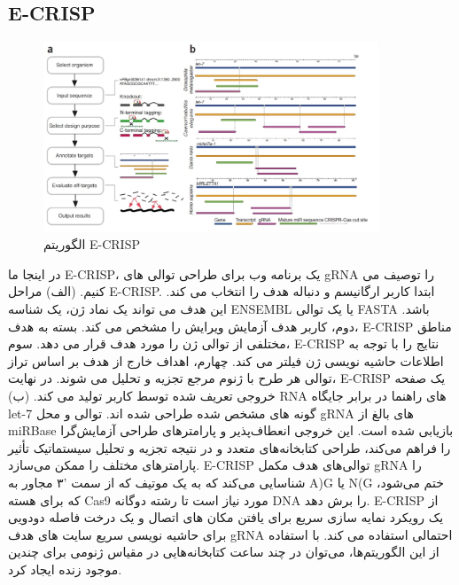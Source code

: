 \documentclass[12pt,a4paper,BCOR=.7cm,headsepline,bibliography=totoc]{report}
\begin{document}
\subsection{E-CRISP}
\begin{figure}
\centering
\includegraphics[width=10cm, ]{pictures/ecrispr.jpg}
\caption{
الگوریتم E-CRISP
}\label{wrap-fig:4}
\end{figure}

در اینجا ما E-CRISP، یک برنامه وب برای طراحی توالی های gRNA را توصیف می کنیم. (الف) مراحل E-CRISP. ابتدا کاربر ارگانیسم و دنباله هدف را انتخاب می کند. این هدف می تواند یک نماد ژن، یک شناسه ENSEMBL یا یک توالی FASTA باشد. دوم، کاربر هدف آزمایش ویرایش را مشخص می کند. بسته به هدف، E-CRISP مناطق مختلفی از توالی ژن را مورد هدف قرار می دهد.
سوم، E-CRISP نتایج را با توجه به اطلاعات حاشیه نویسی ژن فیلتر می کند. چهارم، اهداف خارج از هدف بر اساس تراز توالی هر طرح با ژنوم مرجع تجزیه و تحلیل می شوند. در نهایت، E-CRISP یک صفحه خروجی تعریف شده توسط کاربر تولید می کند.
(ب) RNA های راهنما در برابر جایگاه let-7 گونه های مشخص شده طراحی شده اند. توالی و محل gRNA های بالغ از miRBase بازیابی شده است. این خروجی انعطاف‌پذیر و پارامترهای طراحی آزمایش‌گرا را فراهم می‌کند، طراحی کتابخانه‌های متعدد و در نتیجه تجزیه و تحلیل سیستماتیک تأثیر پارامترهای مختلف را ممکن می‌سازد. E-CRISP توالی‌های هدف مکمل gRNA را شناسایی می‌کند که به یک موتیف که از سمت  '۳ مجاور به A)G یا N(G ختم می‌شود، که برای هسته Cas9 مورد نیاز است تا رشته دوگانه DNA را برش دهد. E-CRISP از یک رویکرد نمایه سازی سریع برای یافتن مکان های اتصال و یک درخت فاصله دودویی برای حاشیه نویسی سریع سایت های هدف gRNA احتمالی استفاده می کند. با استفاده از این الگوریتم‌ها، می‌توان در چند ساعت کتابخانه‌هایی در مقیاس ژنومی برای چندین موجود زنده ایجاد کرد.
\end{document}

